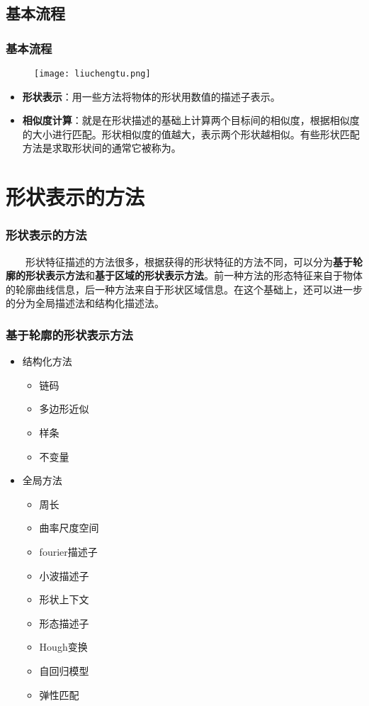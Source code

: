 \documentclass[notheorems,mathserif,table,compress]{beamer}  %
\begin{document}
\subsection{基本流程}

\begin{frame}
\frametitle{基本流程}
   \begin{figure}[!ht]
    \centering
    \texttt{[image: liuchengtu.png]}
   \end{figure} 
   \begin{itemize}
    \item {\color{blue}\textbf{形状表示}}：用一些方法将物体的形状用数值的描述子表示。
    \item {\color{blue}\textbf{相似度计算}}：就是在形状描述的基础上计算两个目标间的相似度，根据相似度的大小进行匹配。形状相似度的值越大，表示两个形状越相似。有些形状匹配方法是求取形状间的{\color{blue}{非相似度}}通常它被称为{\color{blue}{形状间的距离}}。
   \end{itemize}
\end{frame}


\section{形状表示的方法}

\begin{frame}
\frametitle{形状表示的方法}
  \begin{tcolorbox}[colback=red!5,colframe=blue!75!black]
   ~~~~形状特征描述的方法很多，根据获得的形状特征的方法不同，可以分为{\color{blue}\textbf{基于轮廓的形状表示方法}}和{\color{blue}\textbf{基于区域的形状表示方法}}。前一种方法的形态特征来自于物体的轮廓曲线信息，后一种方法来自于形状区域信息。在这个基础上，还可以进一步的分为全局描述法和结构化描述法。
  \end{tcolorbox}
\end{frame}

\begin{frame}
\frametitle{基于轮廓的形状表示方法}
  \begin{itemize}
   \item 结构化方法
	\begin{itemize}
	 \item 链码
	 \item 多边形近似
	 \item 样条
	 \item 不变量
	\end{itemize}
   \item 全局方法
	\begin{itemize}
	 \item 周长
	 \item 曲率尺度空间
	 \item fourier描述子
	 \item 小波描述子
	 \item 形状上下文
	 \item 形态描述子
	 \item Hough变换
	 \item 自回归模型
	 \item 弹性匹配
	\end{itemize}
  \end{itemize}
\end{frame}
\end{document}
